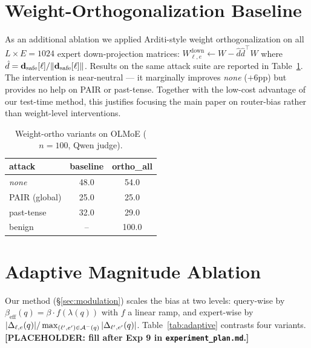\appendix

\section{Weight-Orthogonalization Baseline}
\label{app:weight-ortho}

As an additional ablation we applied Arditi-style weight
orthogonalization on all $L \times E = 1024$ expert down-projection
matrices: $W_{\ell,e}^{\text{down}} \leftarrow W - \hat{d}\hat{d}^\top W$
where $\hat{d} = \mathbf{d}_{\text{safe}}[\ell]/\|\mathbf{d}_{\text{safe}}[\ell]\|$. Results on the same
attack suite are reported in Table~\ref{tab:wortho}. The intervention
is near-neutral — it marginally improves \emph{none} ($+6$pp) but
provides no help on PAIR or past-tense. Together
with the low-cost advantage of our test-time method, this justifies
focusing the main paper on router-bias rather than weight-level
interventions.

\begin{table}[h]
\centering
\caption{Weight-ortho variants on OLMoE ($n{=}100$, Qwen judge).}
\label{tab:wortho}
\small
\begin{tabular}{lcc}
\toprule
attack & baseline & ortho\_all \\
\midrule
\emph{none}   & 48.0 & 54.0 \\
PAIR (global) & 25.0 & 25.0 \\
past-tense    & 32.0 & 29.0 \\
benign        & --   & 100.0 \\
\bottomrule
\end{tabular}
\end{table}

\section{Adaptive Magnitude Ablation}
\label{app:adaptive}

Our method (\S\ref{sec:modulation}) scales the bias at two levels:
query-wise by $\beta_{\text{eff}}(q) = \beta \cdot f(\lambda(q))$ with
$f$ a linear ramp, and expert-wise by
$|\Delta_{\ell,e}(q)| / \max_{(\ell',e')\in{\mathcal{A}^{-}}(q)}|\Delta_{\ell',e'}(q)|$.
Table~\ref{tab:adaptive} contrasts four variants. \textbf{[PLACEHOLDER:
fill after Exp 9 in \texttt{experiment\_plan.md}.]}

